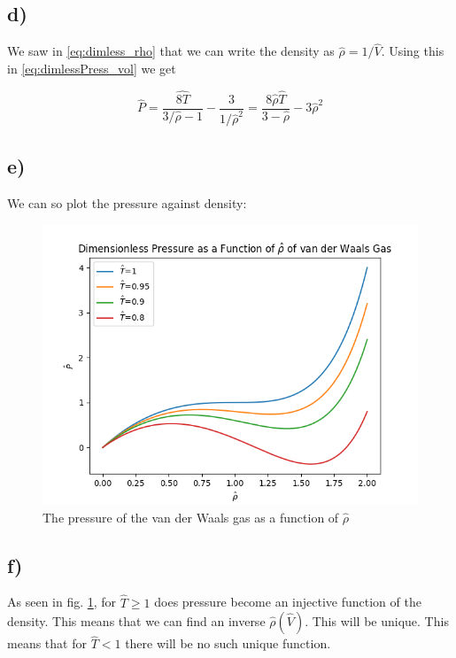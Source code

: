 \documentclass[a4paper,norsk, 10pt]{article}
\begin{document}
\subsection{d)}
We saw in \eqref{eq:dimless_rho} that we can write the density as $\hat{\rho} = 1/\hat{V}$. Using this in \eqref{eq:dimlessPress_vol} we get

\begin{equation}
\hat{P} = \frac{\hat{8T}}{3/\hat{\rho} - 1} - \frac{3}{1/\hat{\rho}^2} = \frac{8\hat{\rho}\hat{T}}{3-\hat{\rho}} - 3\hat{\rho}^2
\label{eq:dimlessPress_dens}
\end{equation}

\subsection{e)}
We can so plot the pressure against density:

\begin{figure}[H]
\centering
\includegraphics[scale=0.5]{p3e.png}
\caption{The pressure of the van der Waals gas as a function of $\hat{\rho}$}
\label{fig:press_rho}
\end{figure}

\subsection{f)}
As seen in fig. \ref{fig:press_rho}, for $\hat{T} \geq 1$ does pressure become an injective function of the density. This means that we can find an inverse $\hat{\rho}(\hat{V})$. This will be unique. This means that for $\hat{T} < 1$ there will be no such unique function.\\
\end{document}
